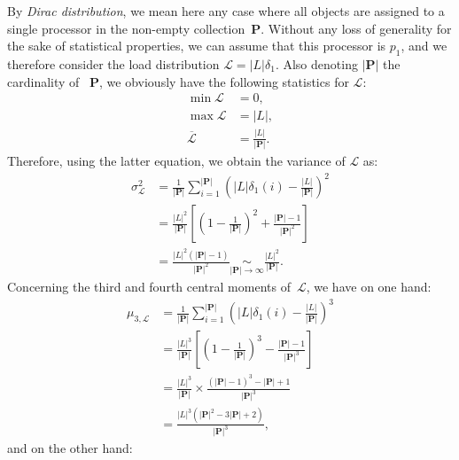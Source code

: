 By \emph{Dirac distribution}, we mean here any case where all objects
are assigned to a single processor in the non-empty
collection~$\mathbf{P}$. Without any loss of generality for the sake
of statistical properties, we can assume that this processor is $p_1$,
and we therefore consider the load distribution
$\mathcal{L}=\vert{L}\vert\delta_1$.
Also denoting $\vert\mathbf{P}\vert$ the cardinality of ~$\mathbf{P}$, we
obviously have the following statistics for $\mathcal{L}$:
\begin{align*}
\min{\mathcal{L}}
&= 0,\\
\max{\mathcal{L}}
&= \vert{L}\vert{},\\
\overline{\mathcal{L}}
&= \frac{\vert{L}\vert}{{\vert\mathbf{P}\vert}}.
\end{align*}
Therefore, using the latter equation, we obtain the variance of
$\mathcal{L}$ as:
\begin{align*}
\sigma_{\mathcal{L}}^2
&= \frac{1}{{\vert\mathbf{P}\vert}}\sum_{i=1}^{\vert\mathbf{P}\vert}\left(
\vert{L}\vert\delta_1(i) - \frac{\vert{L}\vert}{{\vert\mathbf{P}\vert}}\right)^2\\
&= \frac{\vert{L}\vert^2}{{\vert\mathbf{P}\vert}}\left[\left(
1 - \frac{1}{{\vert\mathbf{P}\vert}}\right)^2 +\frac{{\vert\mathbf{P}\vert}-1}{{\vert\mathbf{P}\vert}^2}\right]\\
&= \frac{\vert{L}\vert^2({\vert\mathbf{P}\vert} - 1)}{{\vert\mathbf{P}\vert}^2}
\underset{{\vert\mathbf{P}\vert}\to\infty}{\sim}\frac{\vert{L}\vert^2}{{\vert\mathbf{P}\vert}}.
\end{align*}
Concerning the third and fourth central moments of~$\mathcal{L}$, we
have on one hand:
\begin{align*}
\mu_{3,\mathcal{L}}
&= \frac{1}{{\vert\mathbf{P}\vert}}\sum_{i=1}^{\vert\mathbf{P}\vert}\left(
\vert{L}\vert\delta_1(i) - \frac{\vert{L}\vert}{{\vert\mathbf{P}\vert}}\right)^3\\
&= \frac{\vert{L}\vert^3}{{\vert\mathbf{P}\vert}}\left[\left(
1 - \frac{1}{{\vert\mathbf{P}\vert}}\right)^3 - \frac{{\vert\mathbf{P}\vert}-1}{{\vert\mathbf{P}\vert}^3}\right]\\
&= \frac{\vert{L}\vert^3}{{\vert\mathbf{P}\vert}}\times\frac{({\vert\mathbf{P}\vert}-1)^3 - {\vert\mathbf{P}\vert} + 1}{{\vert\mathbf{P}\vert}^3}\\
&= \frac{\vert{L}\vert^3\left({\vert\mathbf{P}\vert}^2 - 3{\vert\mathbf{P}\vert} + 2\right)}{{\vert\mathbf{P}\vert}^3},
\end{align*}
and on the other hand:
